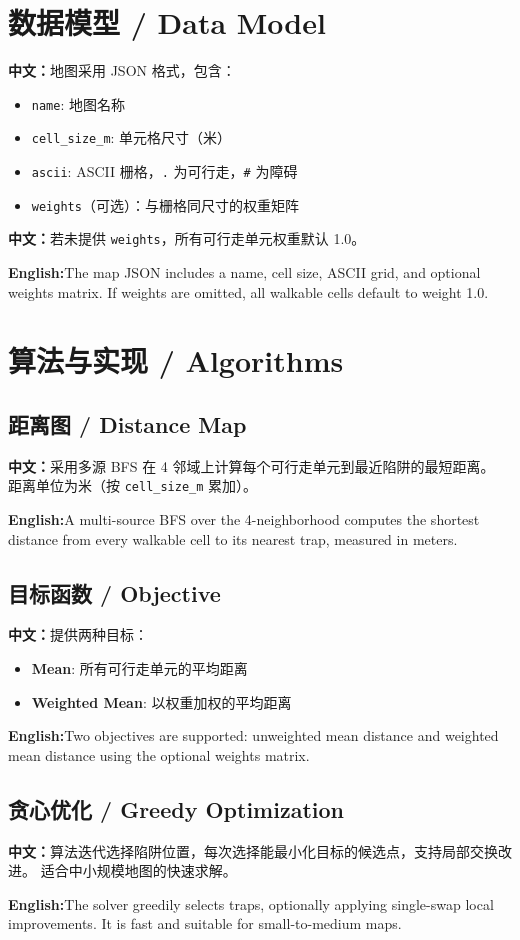 \documentclass[11pt,a4paper]{article}
\newcommand{\CN}{\textbf{中文：}}
\newcommand{\EN}{\textbf{English:}}
\begin{document}
\section{数据模型 / Data Model}
\CN 地图采用 JSON 格式，包含：\par
\begin{itemize}
  \item \texttt{name}: 地图名称
  \item \texttt{cell\_size\_m}: 单元格尺寸（米）
  \item \texttt{ascii}: ASCII 栅格，\texttt{.} 为可行走，\texttt{\#} 为障碍
  \item \texttt{weights}（可选）：与栅格同尺寸的权重矩阵
\end{itemize}
\CN 若未提供 \texttt{weights}，所有可行走单元权重默认 1.0。\par
\EN The map JSON includes a name, cell size, ASCII grid, and optional weights matrix.
If weights are omitted, all walkable cells default to weight 1.0.

\section{算法与实现 / Algorithms}
\subsection{距离图 / Distance Map}
\CN 采用多源 BFS 在 4 邻域上计算每个可行走单元到最近陷阱的最短距离。
距离单位为米（按 \texttt{cell\_size\_m} 累加）。\par
\EN A multi-source BFS over the 4-neighborhood computes the shortest distance from every
walkable cell to its nearest trap, measured in meters.

\subsection{目标函数 / Objective}
\CN 提供两种目标：\par
\begin{itemize}
  \item \textbf{Mean}: 所有可行走单元的平均距离
  \item \textbf{Weighted Mean}: 以权重加权的平均距离
\end{itemize}
\EN Two objectives are supported: unweighted mean distance and weighted mean distance
using the optional weights matrix.

\subsection{贪心优化 / Greedy Optimization}
\CN 算法迭代选择陷阱位置，每次选择能最小化目标的候选点，支持局部交换改进。
适合中小规模地图的快速求解。\par
\EN The solver greedily selects traps, optionally applying single-swap local improvements.
It is fast and suitable for small-to-medium maps.
\end{document}

